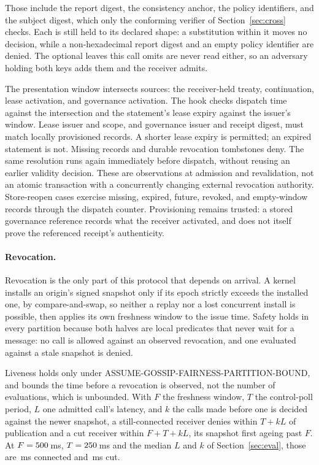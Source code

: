 Those \PSLeafUncomparedCount{} include the report digest, the consistency
anchor, the policy identifiers, and the subject digest, which
only the conforming verifier of Section~\ref{sec:cross} checks. Each is still
held to its declared shape: a substitution within it moves no decision, while a
non-hexadecimal report digest and an empty policy identifier are denied. The
\PSLeafOptionalCount{} optional leaves this call omits are never read either, so
an adversary holding both keys adds them and the receiver admits.

The presentation window intersects \PSPresentationIntervalSources{} sources:
the receiver-held treaty, continuation, lease activation, and governance
activation. The hook checks dispatch time against the intersection and the
statement's lease expiry against the issuer's window. Lease issuer and scope,
and governance issuer and receipt digest, must match locally provisioned
records. A shorter lease expiry is permitted; an expired statement is not.
Missing records and durable revocation tombstones deny. The same resolution
runs again immediately before dispatch, without reusing an earlier validity
decision. These are observations at admission and revalidation, not an atomic
transaction with a concurrently changing external revocation authority.
Store-reopen cases exercise missing, expired, future, revoked, and empty-window
records through the dispatch counter. Provisioning remains trusted: a stored
governance reference records what the receiver activated, and does not itself
prove the referenced receipt's authenticity.

\paragraph{Revocation.}
Revocation is the only part of this protocol that depends on arrival. A kernel
installs an origin's signed snapshot only if its epoch strictly exceeds the
installed one, by compare-and-swap, so neither a replay nor a lost concurrent
install is possible, then applies its own freshness window to the issue time.
Safety holds in every partition because both halves are local predicates that
never wait for a message: no call is allowed against an observed revocation,
and one evaluated against a stale snapshot is denied.

Liveness holds only under ASSUME-GOSSIP-FAIRNESS-PARTITION-BOUND, and bounds the
time before a revocation is observed, not the number of evaluations, which is
unbounded. With $F$ the freshness window, $T$ the control-poll period, $L$
one admitted call's latency, and $k$ the calls made before one is decided
against the newer snapshot, a still-connected receiver denies within $T + kL$ of
publication and a cut receiver within $F + T + kL$, its snapshot first ageing
past $F$. At $F = 500$\,ms, $T = 250$\,ms and the median
$L$ and $k$ of Section~\ref{sec:eval}, those are
\,ms
connected and
\,ms
cut.
